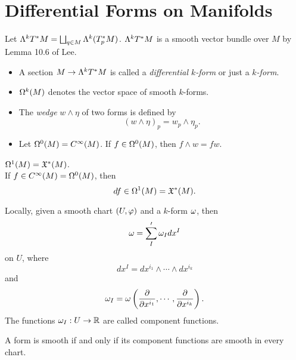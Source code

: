 \section{Differential Forms on Manifolds}
Let $\Lambda^kT^*M = \bigsqcup_{q \in M}\Lambda^k(T_p^*M)$. $\Lambda^kT^*M$ is a smooth vector bundle over $M$ by Lemma 10.6 of Lee. 

\begin{itemize}
    \item A section $M \to \Lambda^k T^*M$ is called a \textit{differential $k$-form} or just a \textit{$k$-form}. 
    \item $\Omega^k(M)$ denotes the vector space of smooth $k$-forms.
    \item The \textit{wedge} $w \wedge \eta$ of two forms is defined by 
    $$(w \wedge \eta)_p = w_p \wedge \eta_p.$$
    \item Let $\Omega^0(M) = C^\infty(M)$. If $ f \in \Omega^0(M)$, then $f \wedge w = fw$. 
\end{itemize}
\begin{remark}
    $\Omega^1(M) = \frak{X}^*(M)$. \\
    If $f \in C^\infty(M) = \Omega^0(M)$, then 
    $$df \in \Omega^1(M) = \frak{X}^*(M). $$
\end{remark}
Locally, given a smooth chart $(U,\varphi)$ and a $k$-form $\omega$, then 
$$\omega = \sum_{I}' \omega_I dx^I $$ on $U$, where 
$$dx^I = dx^{i_1} \wedge \cdots \wedge dx^{i_k} $$
and 
$$\omega_I = \omega\left(\pdv{}{x^{i_1}}, \cdots, \pdv{}{x^{i_k}}\right).$$ The functions $\omega_I:U \to \mathbb{R}$ are called component functions. 
\begin{proposition}
    A form is smooth if and only if its component functions are smooth in every chart.     
\end{proposition}
